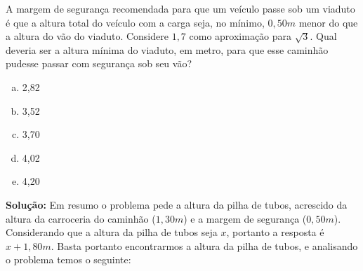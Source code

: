 \begin{multicols*}{2}
    A margem de segurança recomendada para que um veículo passe sob um viaduto é que
    a altura total do veículo com a carga seja, no mínimo, $0,50m$ menor do que a altura
    do vão do viaduto.
    Considere $1,7$ como aproximação para $\sqrt{3}$.
    Qual deveria ser a altura mínima do viaduto, em metro, para que esse caminhão 
    pudesse passar com segurança sob seu vão?
    \begin{enumerate}[(a)]
        \item 2,82
        \item 3,52
        \item 3,70
        \item 4,02
        \item 4,20
    \end{enumerate}

    \textbf{Solução:} Em resumo o problema pede a altura da pilha de tubos, 
    acrescido da altura da carroceria do caminhão ($1,30m$) e a margem de segurança ($0,50m$).
    Considerando que a altura da pilha de tubos seja $x$, portanto a resposta é 
    $x+1,80m$. Basta portanto encontrarmos a altura da pilha de tubos, e analisando 
    o problema temos o seguinte: 
    
    \begin{figure}[H]
        \centering
    \end{figure}


\end{multicols*}
